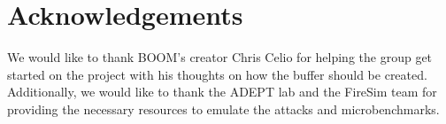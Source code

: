 \section{Acknowledgements}

We would like to thank BOOM's creator Chris Celio for helping the group 
get started on the project with his thoughts on how the buffer should be 
created. Additionally, we would like to thank the ADEPT lab and the FireSim
team for providing the necessary resources to emulate the attacks and 
microbenchmarks.
